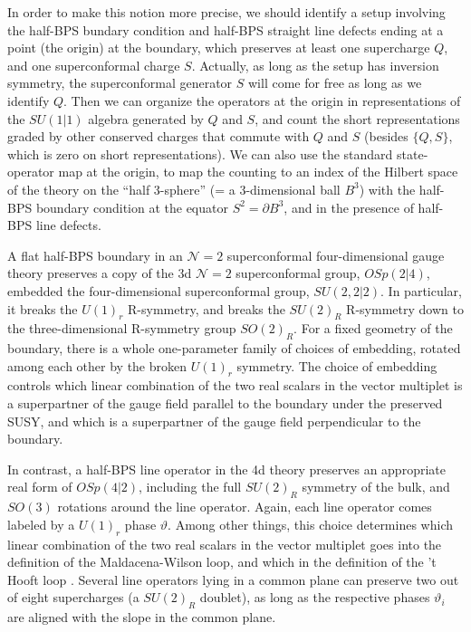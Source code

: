 \documentclass[11pt,letterpaper]{article}
\numberwithin{equation}{section}
\newcommand{\CN}{\mathcal{N}}
\begin{document}
In order to make this notion more precise, we should identify a setup involving
the half-BPS bundary condition and half-BPS straight line defects ending at a point (the origin) at the boundary,
which preserves at least one supercharge $Q$, and one superconformal charge $S$. Actually, as long as the setup has inversion symmetry,
the superconformal generator $S$ will come for free as long as we identify $Q$. Then we can organize the operators at the origin
in representations of the $SU(1|1)$ algebra generated by $Q$ and $S$, and count the short representations
graded by other conserved charges that commute with $Q$ and $S$ (besides $\{Q,S\}$, which is zero on short representations).
We can also use the standard state-operator map at the origin, to map the counting to an index of the Hilbert space of the
theory on the ``half 3-sphere'' (= a 3-dimensional ball $B^3$) with the half-BPS boundary condition at the equator $S^2 = \partial B^3$,
and in the presence of half-BPS line defects.

A flat half-BPS boundary in an $\CN=2$ superconformal four-dimensional gauge theory
preserves a copy of the 3d $\CN=2$ superconformal group, $OSp(2|4)$,
embedded the four-dimensional superconformal group, $SU(2,2|2)$. In particular, it breaks the $U(1)_r$
R-symmetry, and breaks the $SU(2)_R$ R-symmetry down to the three-dimensional R-symmetry group $SO(2)_R$.
For a fixed geometry of the boundary, there is a whole one-parameter family of choices of embedding,
rotated among each other by the broken $U(1)_r$ symmetry.
The choice of embedding controls which linear combination of the two real scalars in the vector multiplet is a superpartner of the gauge field parallel to the boundary
under the preserved SUSY, and which is a superpartner of the gauge field perpendicular to the boundary.

In contrast, a half-BPS line operator in the 4d theory preserves an appropriate real form of $OSp(4|2)$, including the full $SU(2)_R$ symmetry of the bulk, and $SO(3)$ rotations around the line operator.
Again, each line operator comes labeled by a $U(1)_r$ phase $\vartheta$.
Among other things, this choice determines which linear combination of the two real scalars in the vector multiplet goes into the definition of the Maldacena-Wilson loop,
and which in the definition of the 't Hooft loop \cite{Kapustin-WtH, GMNIII}. Several line operators lying in a common plane can preserve two out
of eight supercharges (a $SU(2)_R$ doublet), as long as the respective phases $\vartheta_i$ are aligned with the slope in the common plane.
\end{document}
